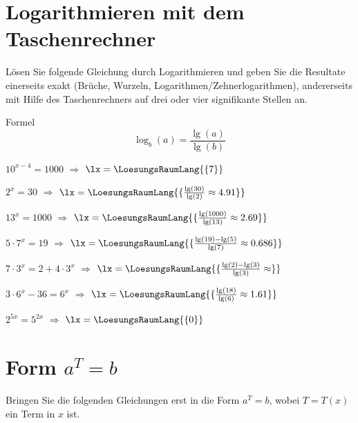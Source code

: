 \section{Logarithmieren mit dem Taschenrechner}
Lösen Sie folgende Gleichung durch Logarithmieren und geben Sie die
Resultate einerseits exakt (Brüche, Wurzeln, Logarithmen/Zehnerlogarithmen), andererseits mit
Hilfe des Taschenrechners auf drei oder vier signifikante Stellen an.

Formel
$$\log_b(a) = \frac{\lg(a)}{\lg(b)}$$

\begin{bbwAufgabenBlock}
\item $10^{x-4}=1000$ $\Longrightarrow$ $\lx=\LoesungsRaumLang{\{7\}}$ \plz{}
\item $2^x=30$ $\Longrightarrow$ $\lx=\LoesungsRaumLang{\{\frac{\lg(30)}{\lg(2)}\approx 4.91\}}$ \plz{}\noTRAINER{\newpage}
\item $13^x=1000$ $\Longrightarrow$ $\lx=\LoesungsRaumLang{\{\frac{\lg(1000)}{\lg(13)}\approx 2.69\}}$ \plz{}
\item $5\cdot{}7^x = 19$ $\Longrightarrow$ $\lx=\LoesungsRaumLang{\{\frac{\lg(19)-\lg(5)}{\lg(7)}\approx 0.686\}}$ \plz{}
\item $7\cdot{}3^x = 2 + 4\cdot{}3^x$ $\Longrightarrow$ $\lx=\LoesungsRaumLang{\{\frac{\lg(2)-\lg(3)}{\lg(3)}\approx  \}}$ \plz{}\noTRAINER{\newpage}
\item $3\cdot{}6^x - 36 = 6^x$ $\Longrightarrow$ $\lx=\LoesungsRaumLang{\{\frac{\lg(18)}{\lg(6)} \approx  1.61 \}}$ \plz{}
\item $2^{5x} = 5^{2x}$ $\Longrightarrow$ $\lx=\LoesungsRaumLang{\{0\}}$ \plz{}
\end{bbwAufgabenBlock}

\newpage
\section{Form $a^{T} = b$}
Bringen Sie die folgenden Gleichungen erst in die Form $a^T=b$, wobei
$T=T(x)$ ein Term in $x$ ist.

